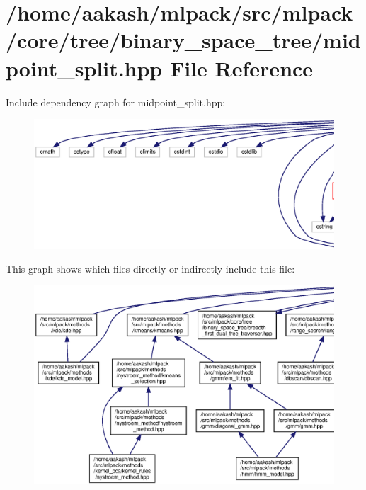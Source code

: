 \section{/home/aakash/mlpack/src/mlpack/core/tree/binary\+\_\+space\+\_\+tree/midpoint\+\_\+split.hpp File Reference}
\label{midpoint__split_8hpp}
Include dependency graph for midpoint\+\_\+split.\+hpp\+:
\nopagebreak
\begin{figure}[H]
\begin{center}
\leavevmode
\includegraphics[width=350pt]{midpoint__split_8hpp__incl}
\end{center}
\end{figure}
This graph shows which files directly or indirectly include this file\+:
\nopagebreak
\begin{figure}[H]
\begin{center}
\leavevmode
\includegraphics[width=350pt]{midpoint__split_8hpp__dep__incl}
\end{center}
\end{figure}
